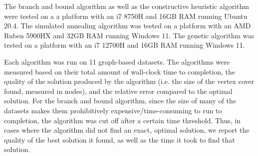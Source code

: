 \documentclass[acmlarge]{acmart}
\begin{document}

The branch and bound algorithm as well as the constructive heuristic algorithm were tested on a a platform with an i7 8750H and 16GB RAM running Ubuntu 20.4. The simulated annealing algorithm was tested on a platform with an AMD Ruben 5900HX and 32GB RAM running Windows 11. The genetic algorithm was tested on a platform with an i7 12700H and 16GB RAM running Windows 11.

Each algorithm was run on 11 graph-based datasets. The algorithms were measured based on their total amount of wall-clock time to completion, the quality of the solution produced by the algorithm (i.e. the size of the vertex cover found, measured in nodes), and the relative error compared to the optimal solution. For the branch and bound algorithm, since the size of many of the datasets makes them prohibitively expensive/time-consuming to run to completion, the algorithm was cut off after a certain time threshold. Thus, in cases where the algorithm did not find an exact, optimal solution, we report the quality of the best solution it found, as well as the time it took to find that solution.
\end{document}
